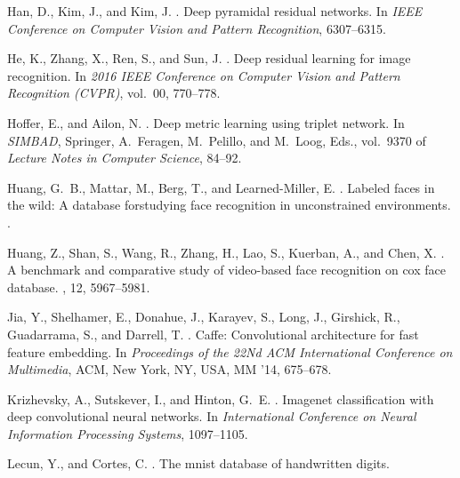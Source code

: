 \documentclass[conference]{acmsiggraph}
\begin{document}
\begin{thebibliography}{\protect{}1998}
{\sc Han, D., Kim, J., and Kim, J.}
.
\newblock Deep pyramidal residual networks.
\newblock In {\em IEEE Conference on Computer Vision and Pattern Recognition},
  6307--6315.

{\sc He, K., Zhang, X., Ren, S., and Sun, J.}
.
\newblock Deep residual learning for image recognition.
\newblock In {\em 2016 IEEE Conference on Computer Vision and Pattern
  Recognition (CVPR)}, vol.~00, 770--778.

{\sc Hoffer, E., and Ailon, N.}
.
\newblock Deep metric learning using triplet network.
\newblock In {\em SIMBAD}, Springer, A.~Feragen, M.~Pelillo, and M.~Loog, Eds.,
  vol.~9370 of {\em Lecture Notes in Computer Science}, 84--92.

{\sc Huang, G.~B., Mattar, M., Berg, T., and Learned-Miller, E.}
.
\newblock Labeled faces in the wild: A database forstudying face recognition in
  unconstrained environments.
.

{\sc Huang, Z., Shan, S., Wang, R., Zhang, H., Lao, S., Kuerban, A., and Chen,
  X.}
.
\newblock A benchmark and comparative study of video-based face recognition on
  cox face database.
, 12, 5967--5981.

{\sc Jia, Y., Shelhamer, E., Donahue, J., Karayev, S., Long, J., Girshick, R.,
  Guadarrama, S., and Darrell, T.}
.
\newblock Caffe: Convolutional architecture for fast feature embedding.
\newblock In {\em Proceedings of the 22Nd ACM International Conference on
  Multimedia}, ACM, New York, NY, USA, MM '14, 675--678.

{\sc Krizhevsky, A., Sutskever, I., and Hinton, G.~E.}
.
\newblock Imagenet classification with deep convolutional neural networks.
\newblock In {\em International Conference on Neural Information Processing
  Systems}, 1097--1105.

{\sc Lecun, Y., and Cortes, C.}
.
\newblock The mnist database of handwritten digits.


\end{thebibliography}
\end{document}
